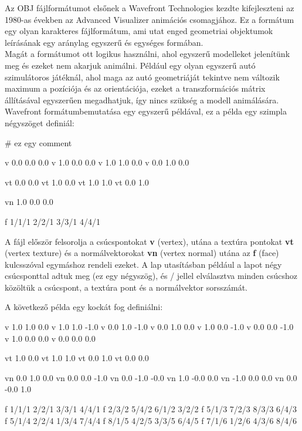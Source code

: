 
Az OBJ fájlformátumot elsőnek a Wavefront Technologies kezdte kifejleszteni az 1980-as években az Advanced Visualizer animációs csomagjához. Ez a formátum egy olyan karakteres fájlformátum, ami utat enged geometriai objektumok leírásának egy aránylag egyszerű és egységes formában. \\
Magát a formátumot ott logikus használni, ahol egyszerű modelleket jelenítünk meg és ezeket nem akarjuk animálni. Például egy olyan egyszerű autó szimulátoros játéknál, ahol maga az autó geometriáját tekintve nem változik maximum a pozíciója és az orientációja, ezeket a transzformációs mátrix állításával egyszerűen megadhatjuk, így nincs szükség a modell animálására.\\
Wavefront formátumbemutatása egy egyszerű példával, ez a példa egy szimpla négyszöget definiál:
\begin{cpp} 
# ez egy comment

v 0.0 0.0 0.0
v 1.0 0.0 0.0
v 1.0 1.0 0.0
v 0.0 1.0 0.0

vt 0.0 0.0
vt 1.0 0.0
vt 1.0 1.0
vt 0.0 1.0

vn 1.0 0.0 0.0 

f 1/1/1 2/2/1 3/3/1 4/4/1
\end{cpp}

A fájl először felsorolja a csúcspontokat \textbf{v} (vertex), utána a textúra pontokat \textbf{vt} (vertex texture) és a normálvektorokat \textbf{vn} (vertex normal) utána  az \textbf{f} (face) kulcsszóval egymáshoz rendeli ezeket. A lap utasításban például a lapot négy csúcsponttal adtuk meg (ez egy négyszög), és / jellel elválasztva minden csúcshoz közöltük a csúcspont, a textúra pont és a normálvektor sorsszámát. \newpage

\noindent A következő példa egy kockát fog definiálni:
\begin{cpp} 
v 1.0 1.0 0.0
v 1.0 1.0 -1.0
v 0.0 1.0 -1.0
v 0.0 1.0 0.0
v 1.0 0.0 -1.0
v 0.0 0.0 -1.0
v 1.0 0.0 0.0
v 0.0 0.0 0.0

vt 1.0 0.0
vt 1.0 1.0
vt 0.0 1.0
vt 0.0 0.0

vn 0.0 1.0 0.0
vn 0.0 0.0 -1.0
vn 0.0 -1.0 -0.0
vn 1.0 -0.0 0.0
vn -1.0 0.0 0.0
vn 0.0 -0.0 1.0

f 1/1/1 2/2/1 3/3/1 4/4/1
f 2/3/2 5/4/2 6/1/2 3/2/2
f 5/1/3 7/2/3 8/3/3 6/4/3
f 5/1/4 2/2/4 1/3/4 7/4/4
f 8/1/5 4/2/5 3/3/5 6/4/5
f 7/1/6 1/2/6 4/3/6 8/4/6
\end{cpp}

